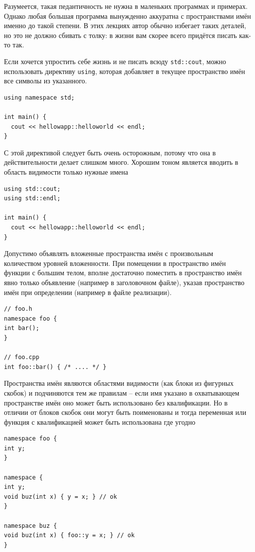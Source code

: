 \documentclass[a4paper,12pt,oneside]{book}
\begin{document}
Разумеется, такая педантичность не нужна в маленьких программах и примерах. Однако любая большая программа вынужденно аккуратна с пространствами имён именно до такой степени. В этих лекциях автор обычно избегает таких деталей, но это не должно сбивать с толку: в жизни вам скорее всего придётся писать как-то так.

Если хочется упростить себе жизнь и не писать всюду \lstinline!std::cout!, можно использовать директиву \lstinline!using!, которая добавляет в текущее пространство имён все символы из указанного.

\begin{lstlisting}
using namespace std;

int main() {
  cout << hellowapp::helloworld << endl;
}
\end{lstlisting}

С этой директивой следует быть очень осторожным, потому что она в действительности делает слишком много. Хорошим тоном является вводить в область видимости только нужные имена

\begin{lstlisting}
using std::cout;
using std::endl;

int main() {
  cout << hellowapp::helloworld << endl;
}
\end{lstlisting}

Допустимо объявлять вложенные пространства имён с произвольным количеством уровней вложенности. При помещении в пространство имён функции с большим телом, вполне достаточно поместить в пространство имён явно только объявление (например в заголовочном файле), указав пространство имён при определении (например в файле реализации).

\begin{lstlisting}
// foo.h 
namespace foo {
int bar();
}

// foo.cpp
int foo::bar() { /* .... */ }
\end{lstlisting}

Пространства имён являются областями видимости (как блоки из фигурных скобок) и подчиняются тем же правилам – если имя указано в охватывающем пространстве имён оно может быть использовано без квалификации. Но в отличии от блоков скобок они могут быть поименованы и тогда переменная или функция с квалификацией может быть использована где угодно

\begin{lstlisting}
namespace foo {
int y;
}

namespace {
int y;
void buz(int x) { y = x; } // ok
}

namespace buz {
void buz(int x) { foo::y = x; } // ok
}
\end{lstlisting}
\end{document}
